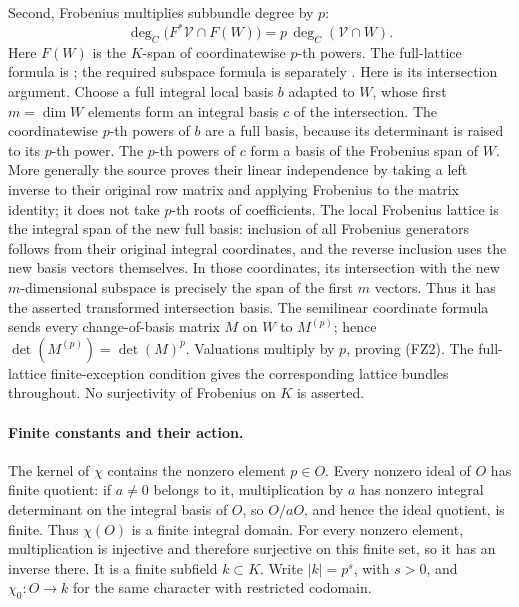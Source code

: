 Second, Frobenius multiplies subbundle degree by \(p\):
\[
       \deg_C\bigl(F^*\mathcal V\cap F(W)\bigr)
                               =p\,\deg_C(\mathcal V\cap W).
 \tag{FZ2}\label{eq:faithful-frob-subdegree}
\]
Here \(F(W)\) is the \(K\)-span of coordinatewise
\(p\)-th powers.
The full-lattice formula is
; the required
subspace formula is separately
.
Here is its intersection argument.
Choose a full integral local basis \(b\) adapted to \(W\),
whose first \(m=\dim W\) elements form an integral
basis \(c\) of the intersection.
The coordinatewise \(p\)-th powers of \(b\) are a full
basis, because its determinant is raised to its
\(p\)-th power.
The \(p\)-th powers of \(c\) form a basis of the
Frobenius span of \(W\).
More generally the source proves their linear independence
by taking a left inverse to their original row matrix
and applying Frobenius to the matrix identity; it does
not take \(p\)-th roots of coefficients.
The local Frobenius lattice is the integral span of
the new full basis: inclusion of all Frobenius
generators follows from their original integral
coordinates, and the reverse inclusion uses the
new basis vectors themselves.
In those coordinates, its intersection with the
new \(m\)-dimensional subspace is precisely the span
of the first \(m\) vectors.
Thus it has the asserted transformed intersection basis.
The semilinear coordinate formula sends every
change-of-basis matrix \(M\) on \(W\) to \(M^{(p)}\);
hence \(\det(M^{(p)})=\det(M)^p\).
Valuations multiply by \(p\), proving (FZ2).
The full-lattice finite-exception condition gives the
corresponding lattice bundles throughout.
No surjectivity of Frobenius on \(K\) is asserted.

\paragraph{Finite constants and their action.}
The kernel of \(\chi\) contains the nonzero element
\(p\in O\).
Every nonzero ideal of \(O\) has finite quotient:
if \(a\ne0\) belongs to it, multiplication by \(a\)
has nonzero integral determinant on the integral basis
of \(O\), so \(O/aO\), and hence the ideal quotient,
is finite.
Thus \(\chi(O)\) is a finite integral domain.
For every nonzero element, multiplication is injective
and therefore surjective on this finite set, so it has
an inverse there.
It is a finite subfield \(k\subset K\).
Write \(|k|=p^s\), with \(s>0\), and
\(\chi_0:O\to k\) for the same character with restricted
codomain.

